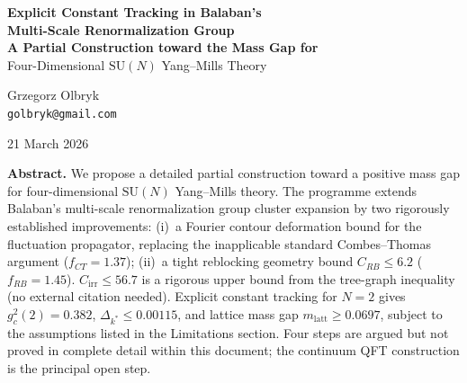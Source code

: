 \documentclass[12pt,a4paper]{article}
\begin{document}
\begin{center}
  \vspace*{2.5cm}

  {\LARGE\bfseries Explicit Constant Tracking in Balaban's}\\[0.4cm]
  {\LARGE\bfseries Multi-Scale Renormalization Group}\\[0.7cm]
  {\large\bfseries A Partial Construction toward the Mass Gap for}\\[0.3cm]
  {\large Four-Dimensional $\mathrm{SU}(N)$ Yang--Mills Theory}

  \vspace{2cm}

  {\Large Grzegorz Olbryk}\\[0.3cm]
  {\normalsize \texttt{golbryk@gmail.com}}

  \vspace{1.5cm}

  {\large 21 March 2026}

  \vspace{2cm}

  \begin{minipage}{0.84\textwidth}
    \textbf{Abstract.}
    We propose a detailed partial construction toward a positive mass gap
    for four-dimensional $\mathrm{SU}(N)$ Yang--Mills theory.
    The programme extends Balaban's multi-scale renormalization group
    cluster expansion by two rigorously established improvements:
    (i)~a Fourier contour deformation bound for the fluctuation propagator,
    replacing the inapplicable standard Combes--Thomas argument ($f_{CT} = 1.37$);
    (ii)~a tight reblocking geometry bound $C_{RB} \le 6.2$ ($f_{RB} = 1.45$).
    $C_{\mathrm{irr}} \le 56.7$ is a rigorous upper bound from the tree-graph
    inequality (no external citation needed).
    Explicit constant tracking for $N = 2$ gives $g^2_c(2) = 0.382$,
    $\Delta_{k^*} \le 0.00115$, and lattice mass gap $m_{\mathrm{latt}} \ge 0.0697$,
    subject to the assumptions listed in the Limitations section.
    Four steps are argued but not proved in complete detail within this document;
    the continuum QFT construction is the principal open step.
  \end{minipage}

  \vspace{2cm}


\end{center}
\end{document}
